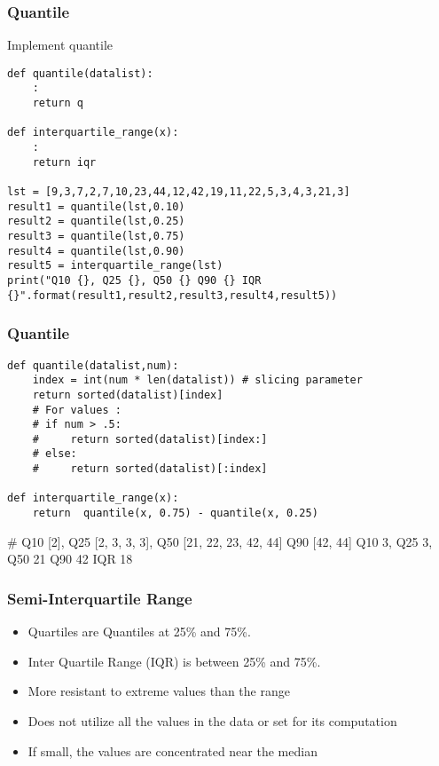 \begin{frame}[fragile]\frametitle{Quantile}
Implement quantile
\begin{lstlisting}
def quantile(datalist):
	:
	return q

def interquartile_range(x):
	:
	return iqr
	
lst = [9,3,7,2,7,10,23,44,12,42,19,11,22,5,3,4,3,21,3]
result1 = quantile(lst,0.10)
result2 = quantile(lst,0.25)
result3 = quantile(lst,0.75)
result4 = quantile(lst,0.90)
result5 = interquartile_range(lst)
print("Q10 {}, Q25 {}, Q50 {} Q90 {} IQR {}".format(result1,result2,result3,result4,result5))
\end{lstlisting}
\end{frame}


\begin{frame}[fragile]\frametitle{Quantile}
\begin{lstlisting}
def quantile(datalist,num):
    index = int(num * len(datalist)) # slicing parameter
    return sorted(datalist)[index]
    # For values :
    # if num > .5:
    #     return sorted(datalist)[index:]
    # else:
    #     return sorted(datalist)[:index]

def interquartile_range(x):
    return	quantile(x, 0.75) - quantile(x, 0.25)
\end{lstlisting}
\# Q10 [2], Q25 [2, 3, 3, 3], Q50 [21, 22, 23, 42, 44] Q90 [42, 44]
Q10 3, Q25 3, Q50 21 Q90 42 IQR 18
\end{frame}

\begin{frame}[fragile]\frametitle{Semi-Interquartile Range}	
\begin{itemize}
\item Quartiles are Quantiles at 25\% and 75\%.
\item Inter Quartile Range (IQR) is between 25\% and 75\%.
\item More resistant to extreme values than the range
\item Does not utilize all the values in the data or set for its computation
\item If small, the values are concentrated near the median
\end{itemize}
\end{frame}

